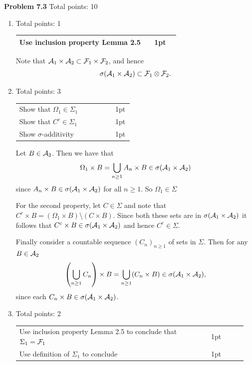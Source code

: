 \documentclass{lecturenotes}
\newcommand{\rubric}[1]{#1}
\begin{document}
\bigskip

\textbf{Problem 7.3} \rubric{Total points: 10}
\begin{enumerate}[label={(\alph*)}]
\item \rubric{ Total points: 1 \hfill

\begin{tabular}{p{0.8\linewidth}p{0.15\linewidth}}
\hline
Use inclusion property Lemma 2.5 & 1pt\\
\hline
\end{tabular}

}
Note that $\mathcal A_1 \times \mathcal A_2 \subset \mathcal F_1 \times \mathcal F_2$, and hence
\[
	\sigma(\mathcal A_1 \times \mathcal A_2) \subset \mathcal F_1 \otimes \mathcal F_2.
\]
\item \rubric{ Total points: 3 \hfill

\begin{tabular}{p{0.8\linewidth}p{0.15\linewidth}}
\hline
Show that $\Omega_1 \in \Sigma_1$ & 1pt\\
Show that $C^c \in \Sigma_1$ & 1pt\\
Show $\sigma$-additivity & 1pt\\
\hline
\end{tabular}

}
Let $B \in \mathcal A_2$. Then we have that
\[
	\Omega_1 \times B = \bigcup_{n \ge 1} A_n \times B \in \sigma(\mathcal A_1 \times \mathcal A_2) 
\]
since $A_n \times B \in \sigma(\mathcal A_1 \times \mathcal A_2)$ for all $n \ge 1$. So $\Omega_1 \in \Sigma$

For the second property, let $C \in \Sigma$ and note that $C^c \times B = (\Omega_1 \times B) \setminus (C \times B)$.
Since both these sets are in $\sigma(\mathcal A_1 \times \mathcal A_2)$ it follows that $C^c \times B \in \sigma(\mathcal A_1 \times \mathcal A_2)$ and hence $C^c \in \Sigma$.

Finally consider a countable sequence $(C_n)_{n \ge 1}$ of sets in $\Sigma$. Then for any $B \in \mathcal A_2$
\[
	\left(\bigcup_{n \ge 1} C_n \right) \times B = \bigcup_{n \ge 1} (C_n \times B) \in \sigma(\mathcal A_1 \times \mathcal A_2),
\]
since each $C_n \times B \in \sigma(\mathcal A_1 \times \mathcal A_2)$.
\item \rubric{ Total points: 2 \hfill

\begin{tabular}{p{0.8\linewidth}p{0.15\linewidth}}
\hline
Use inclusion property Lemma 2.5 to conclude that $\Sigma_1 = \mathcal F_1$& 1pt\\
Use definition of $\Sigma_1$ to conclude & 1pt\\ 
\hline
\end{tabular}

}
\end{enumerate}
\end{document}
